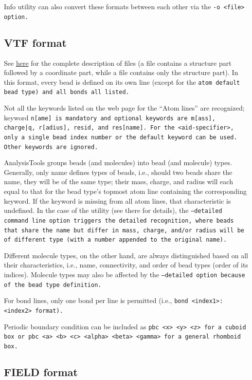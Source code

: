 Info utility can also convert these formats between each other via the \tt{-o
<file>} option.

\subsection{VTF format}\label{ssec:StructVtf} %

See \href{https://github.com/olenz/vtfplugin/wiki/VTF-format}{here} for the
complete description of \vtsf files (a \vtf file contains a structure part
followed by a coordinate part, while a \vsf file contains only the structure
part). In this format, every bead is defined on its own line (except for the
\tt{atom default} bead type) and all bonds all listed.

Not all the keywords listed on the web page for the \enquote{Atom lines} are
recognized; keyword \tt{n[ame]} is mandatory and optional keywords are
\tt{m[ass]}, \tt{charge|q}, \tt{r[adius]}, \tt{resid}, and \tt{res[name]}. For
the \tt{<aid-specifier>}, only a single bead index number or the \tt{default}
keyword can be used. Other keywords are ignored.

AnalysisTools groups beads (and molecules) into bead (and molecule) types.
Generally, only name defines types of beads, i.e., should two beads share the
name, they will be of the same type; their mass, charge, and radius will each
equal to that for the bead type’s topmost atom line containing the corresponding
keyword. If the keyword is missing from all atom lines, that characteristic is
undefined. In the case of the  utility (see there for
details), the \tt{--detailed} command line option triggers the detailed
recognition, where beads that share the name but differ in mass, charge, and/or
radius will be of different type (with a number appended to the original name).

Different molecule types, on the other hand, are always distinguished based on
all their characteristics, i.e., name, connectivity, and order of bead types
(order of its \vsf indices). Molecule types may also be affected by the
\tt{--detailed} option because of the bead type definition.

For bond lines, only one bond per line is permitted (i.e., \tt{bond
<index1>:<index2>} format).

Periodic boundary condition can be included as \tt{pbc <x> <y> <z>} for a cuboid
box or \tt{pbc <a> <b> <c> <alpha> <beta> <gamma>} for a general rhomboid
box. %

\subsection{FIELD format}\label{ssec:StructField} %

